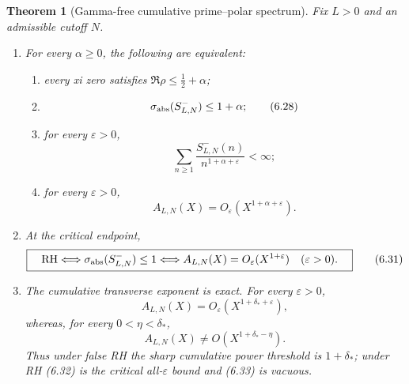 \documentclass[11pt]{article}
\newtheorem{theorem}{Theorem}[section]
\begin{document}
\begin{theorem}[Gamma-free cumulative prime--polar spectrum]
\label{thm:prime-polar-cumulative-spectrum}
Fix $L>0$ and an admissible cutoff $N$.
\begin{enumerate}[label=\textup{(\roman*)}]
\item For every $\alpha\ge0$, the following are equivalent:
\begin{enumerate}[label=\textup{(\alph*)}]
\item every xi zero satisfies $\Re\rho\le\frac12+\alpha$;
\item
\[
 \sigma_{\rm abs}(S_{L,N}^-)\le1+\alpha;
 \tag{6.28}
\]
\item for every $\varepsilon>0$,
\[
 \sum_{n\ge1}\frac{S_{L,N}^-(n)}{n^{1+\alpha+\varepsilon}}<\infty;
 \tag{6.29}
\]
\item for every $\varepsilon>0$,
\[
 A_{L,N}(X)=O_\varepsilon(X^{1+\alpha+\varepsilon}).
 \tag{6.30}
\]
\end{enumerate}

\item At the critical endpoint,
\[
 \boxed{\quad
 \mathrm{RH}
 \Longleftrightarrow \sigma_{\rm abs}(S_{L,N}^-)\le1
 \Longleftrightarrow
 A_{L,N}(X)=O_\varepsilon(X^{1+\varepsilon})
 \quad(\varepsilon>0).
 \quad}
 \tag{6.31}
\]

\item The cumulative transverse exponent is exact.  For every $\varepsilon>0$,
\[
 A_{L,N}(X)=O_\varepsilon
   (X^{1+\delta_*+\varepsilon}),
 \tag{6.32}
\]
whereas, for every $0<\eta<\delta_*$,
\[
 A_{L,N}(X)\ne O(X^{1+\delta_*-\eta}).
 \tag{6.33}
\]
Thus under false RH the sharp cumulative power threshold is $1+\delta_*$; under RH
\textup{(6.32)} is the critical all-$\varepsilon$ bound and \textup{(6.33)} is vacuous.
\end{enumerate}
\end{theorem}
\end{document}

